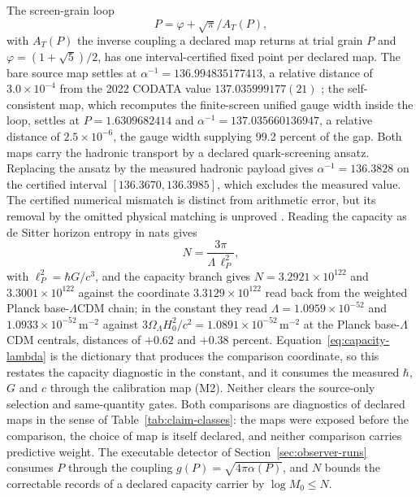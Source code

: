 \documentclass[11pt]{article}
\theoremstyle{definition}
\theoremstyle{remark}
\begin{document}
The screen-grain loop
\[
P=\varphi+\sqrt{\pi}/A_T(P),
\]
with $A_T(P)$ the inverse coupling a declared map returns at trial grain $P$
and $\varphi=(1+\sqrt5)/2$, has one interval-certified fixed point per
declared map. The bare source map settles at
$\alpha^{-1}=136.994835177413$, a relative distance of $3.0\times10^{-4}$
from the 2022 CODATA value $137.035999177(21)$ \cite{codata2022}; the
self-consistent map, which recomputes the finite-screen unified gauge width
inside the loop, settles at $P=1.6309682414$ and
$\alpha^{-1}=137.035660136947$, a relative distance of $2.5\times10^{-6}$,
the gauge width supplying 99.2 percent of the gap. Both maps carry the hadronic transport by a declared quark-screening ansatz. Replacing the ansatz by the measured hadronic payload gives $\alpha^{-1}=136.3828$ on the certified interval $[136.3670,136.3985]$, which excludes the measured value. The certified numerical mismatch is distinct from arithmetic error, but its removal by the omitted physical matching is unproved \cite{ophalpha}. Reading the capacity as de Sitter horizon
entropy in nats gives
\begin{equation}
N=\frac{3\pi}{\Lambda\,\ell_P^{2}},
\label{eq:capacity-lambda}
\end{equation}
with $\ell_P^{2}=\hbar G/c^{3}$, and the capacity branch gives $N=3.2921\times10^{122}$ and
$3.3001\times10^{122}$ against the coordinate $3.3129\times10^{122}$ read
back from the weighted Planck base-$\Lambda$CDM chain; in the constant they
read $\Lambda=1.0959\times10^{-52}$ and $1.0933\times10^{-52}\,\mathrm m^{-2}$
against $3\Omega_\Lambda H_0^{2}/c^{2}=1.0891\times10^{-52}\,\mathrm m^{-2}$ at
the Planck base-$\Lambda$CDM centrals, distances of $+0.62$ and $+0.38$ percent.
Equation~\eqref{eq:capacity-lambda} is the dictionary that produces the
comparison coordinate, so this restates the capacity diagnostic in the
constant, and it consumes the measured $\hbar$, $G$ and $c$ through the
calibration map (M2). Neither clears the source-only selection and same-quantity gates. Both
comparisons are diagnostics of declared maps in the sense of
Table~\ref{tab:claim-classes}:
the maps were exposed before the comparison,
the choice of map is itself declared, and neither comparison carries predictive weight. The executable
detector of Section~\ref{sec:observer-runs} consumes $P$ through the coupling
$g(P)=\sqrt{4\pi\alpha(P)}$, and $N$ bounds the correctable records of a
declared capacity carrier by $\log M_0\le N$.
\end{document}
